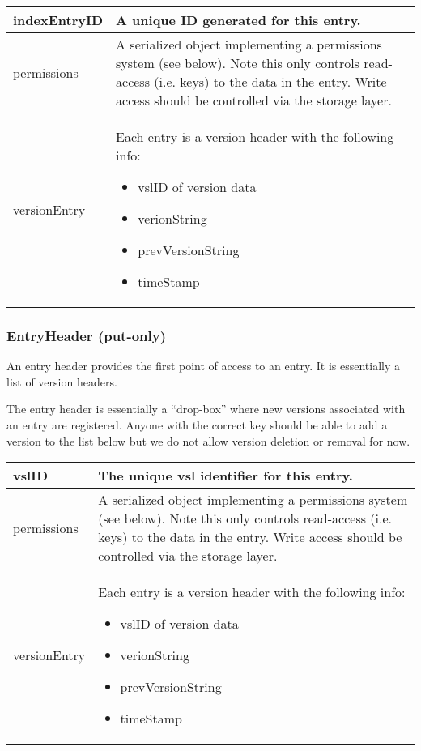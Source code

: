 \documentclass[10pt]{article}
\begin{document}
\begin{tabular}{|l|p{12cm}|}
\hline
indexEntryID & A unique ID generated for this entry. \\
\hline
permissions & A serialized object implementing a permissions system (see below).
Note this only controls read-access (i.e. keys) to the data in the entry.  Write
access should be controlled via the storage layer. \\
\hline
versionEntry &  Each entry is a version header with the following info:
\begin{itemize}
	\item vslID of version data
	\item verionString 
	\item prevVersionString
	\item timeStamp
\end{itemize}\\
\hline
\end{tabular}


\subsubsection{EntryHeader (put-only)}

An entry header provides the first point of access to an entry.  It is
essentially a list of version headers.

The entry header is essentially a ``drop-box'' where new versions associated
with an entry are registered.  Anyone with the correct key should be able to
add a version to the list below but we do not allow version deletion or removal
for now.


\begin{tabular}{|l|p{12cm}|}
\hline
vslID & The unique vsl identifier for this entry.\\
\hline
permissions & A serialized object implementing a permissions system (see below).
Note this only controls read-access (i.e. keys) to the data in the entry.  Write
access should be controlled via the storage layer. \\
\hline
versionEntry &  Each entry is a version header with the following info:
\begin{itemize}
	\item vslID of version data
	\item verionString 
	\item prevVersionString
	\item timeStamp
\end{itemize}\\
\hline
\end{tabular}
\end{document}
